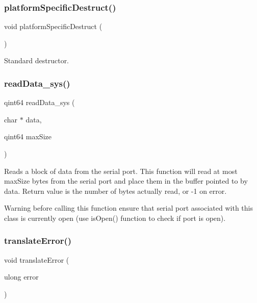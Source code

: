 \subsubsection{\texorpdfstring{platformSpecificDestruct()}{platformSpecificDestruct()}}
{\footnotesize\ttfamily void platform\+Specific\+Destruct (\begin{DoxyParamCaption}{ }\end{DoxyParamCaption})}

Standard destructor. \mbox{\label{class_qext_serial_port_private_a0c76b5bb1bba7aee3a95d67c92628444}} 
\subsubsection{\texorpdfstring{readData\_sys()}{readData\_sys()}}
{\footnotesize\ttfamily qint64 read\+Data\+\_\+sys (\begin{DoxyParamCaption}\item[{char $\ast$}]{data,  }\item[{qint64}]{max\+Size }\end{DoxyParamCaption})}

Reads a block of data from the serial port. This function will read at most max\+Size bytes from the serial port and place them in the buffer pointed to by data. Return value is the number of bytes actually read, or -\/1 on error.

\begin{DoxyWarning}{Warning}
before calling this function ensure that serial port associated with this class is currently open (use is\+Open() function to check if port is open). 
\end{DoxyWarning}
\mbox{\label{class_qext_serial_port_private_af7dc13c59e6155d7812cd86c956cf7da}} 
\subsubsection{\texorpdfstring{translateError()}{translateError()}}
{\footnotesize\ttfamily void translate\+Error (\begin{DoxyParamCaption}\item[{ulong}]{error }\end{DoxyParamCaption})}

